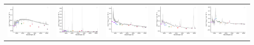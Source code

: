 \begin{center}
\begin{longtable}{l l l l l }
    \includegraphics[width=0.2\linewidth, clip]{Figs/Figs-sdss/spec-9144-57666-0046-SPLUS-s02s04-008782.pdf} & \includegraphics[width=0.2\linewidth, clip]{Figs/Figs-sdss/spec-9144-57666-0109-STRIPE82-0127-008619.pdf} & \includegraphics[width=0.2\linewidth, clip]{Figs/Figs-sdss/spec-9145-58041-0210-SPLUS-s02s05-026507.pdf} & \includegraphics[width=0.2\linewidth, clip]{Figs/Figs-sdss/spec-9146-58042-0345-SPLUS-s02s07-034127.pdf} & \includegraphics[width=0.2\linewidth, clip]{Figs/Figs-sdss/spec-9146-58042-0510-STRIPE82-0131-050516.pdf} \\

\end{longtable}
\end{center}
